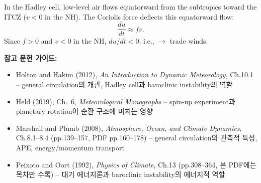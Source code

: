 \begin{hisublock}
\end{hisublock}

\begin{example}
  In the Hadley cell, low-level air flows equatorward from the subtropics toward the ITCZ
  ($v < 0$ in the NH).  The Coriolis force deflects this equatorward flow:
  \begin{equation}\label{eq:trade-wind-coriolis}
    \frac{du}{dt} \approx fv.
  \end{equation}
  Since $f > 0$ and $v < 0$ in the NH, $du/dt < 0$, i.e., 
  $\to$ trade winds.
\end{example}

\begin{hisublock}
\textbf{참고 문헌 가이드:}
\begin{itemize}
  \item Holton and Hakim (2012), \textit{An Introduction to Dynamic Meteorology}, Ch.10.1 -- general circulation의 개관, Hadley cell과 baroclinic instability의 역할
  \item Held (2019), Ch.~6, \textit{Meteorological Monographs} -- spin-up experiment과 planetary rotation이 순환 구조에 미치는 영향
  \item Marshall and Plumb (2008), \textit{Atmosphere, Ocean, and Climate Dynamics}, Ch.8.1--8.4 (pp.139--157, PDF pp.160--178) -- general circulation의 관측적 특성, APE, energy/momentum transport
  \item Peixoto and Oort (1992), \textit{Physics of Climate}, Ch.13 (pp.308--364, 본 PDF에는 목차만 수록) -- 대기 에너지론과 baroclinic instability의 에너지적 역할
\end{itemize}
\end{hisublock}
